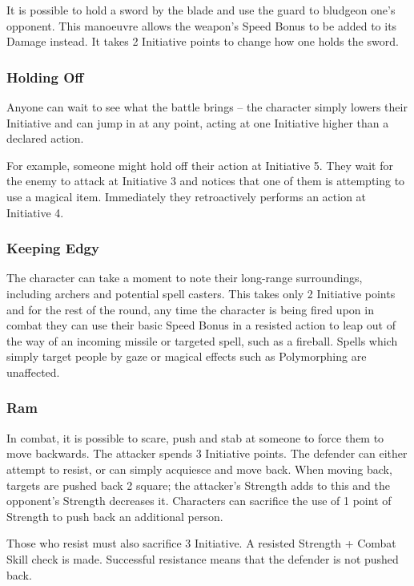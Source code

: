 \begin{multicols}{2}
It is possible to hold a sword by the blade and use the guard to bludgeon one's opponent. This manoeuvre allows the weapon's Speed Bonus to be added to its Damage instead. It takes 2 Initiative points to change how one holds the sword.

\subsubsection{Holding Off}

Anyone can wait to see what the battle brings -- the character simply lowers their Initiative and can jump in at any point, acting at one Initiative higher than a declared action.

For example, someone might hold off their action at Initiative 5. They wait for the enemy to attack at Initiative 3 and notices that one of them is attempting to use a magical item. Immediately they retroactively performs an action at Initiative 4.

\subsubsection{Keeping Edgy}\label{edgy}

The character can take a moment to note their long-range surroundings, including archers and potential spell casters.
This takes only 2 Initiative points and for the rest of the \gls{round}, any time the character is being fired upon in combat they can use their basic Speed Bonus in a resisted action to leap out of the way of an incoming missile or targeted spell, such as a fireball.
Spells which simply target people by gaze or magical effects such as Polymorphing are unaffected.

\subsubsection{Ram}
\label{ram}

In combat, it is possible to scare, push and stab at someone to force them to move backwards. The attacker spends 3 Initiative points. The defender can either attempt to resist, or can simply acquiesce and move back. When moving back, targets are pushed back 2 square; the attacker's Strength adds to this and the opponent's Strength decreases it. Characters can sacrifice the use of 1 point of Strength to push back an additional person.

Those who resist must also sacrifice 3 Initiative. A resisted Strength + Combat Skill check is made. Successful resistance means that the defender is not pushed back.


\end{multicols}
